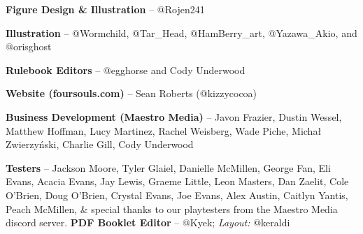 \documentclass[
  fontsize=10pt,
  paper=a5,
  version=last,
  chapterprefix=true,
  bindingoffset=5mm,
  ]{scrbook}
\begin{document}
    \textbf{Figure Design \& Illustration} – @Rojen241

    \textbf{Illustration} – @Wormchild, @Tar\_Head, @HamBerry\_art, @Yazawa\_Akio, and @orisghost
    
    \textbf{Rulebook Editors} – @egghorse and Cody Underwood
    
    \textbf{Website (foursouls.com)} – Sean Roberts (@kizzycocoa)
    
    \textbf{Business Development (Maestro Media)} – Javon Frazier, Dustin Wessel, Matthew Hoffman, Lucy Martinez, Rachel Weisberg, Wade Piche, Michał Zwierzyński, Charlie Gill, Cody Underwood
    
    \textbf{Testers} – Jackson Moore, Tyler Glaiel, Danielle McMillen, George Fan, Eli Evans, Acacia Evans, Jay Lewis, Graeme Little, Leon Masters, Dan Zaelit, Cole O’Brien, Doug O’Brien, Crystal Evans, Joe Evans, Alex Austin, Caitlyn Yantis, Peach McMillen, \& special thanks to our playtesters from the Maestro Media discord server.
    \vfill
    \textbf{PDF Booklet Editor} – @Kyek; \textit{Layout:} @keraldi
\end{document}

